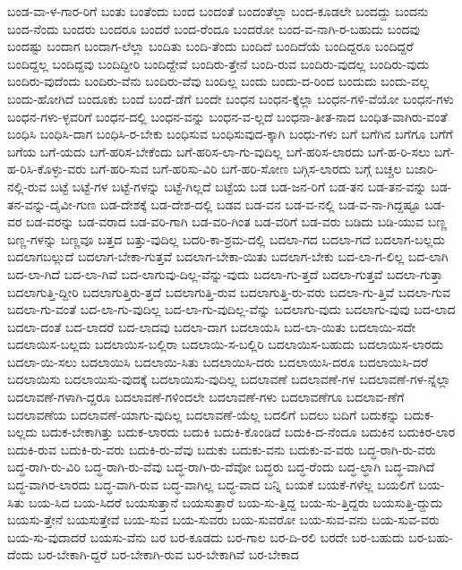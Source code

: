 {ಬಂಡ-ವಾ-ಳ-ಗಾರ-ರಿಗೆ
ಬಂತು
ಬಂತೆಂದು
ಬಂದ
ಬಂದಂತೆ
ಬಂದಂತೆಲ್ಲಾ
ಬಂದ-ಕೂಡಲೇ
ಬಂದದ್ದು
ಬಂದನು
ಬಂದ-ನೆಂದು
ಬಂದರು
ಬಂದರೂ
ಬಂದರೆ
ಬಂದ-ರೆಂದೂ
ಬಂದರೋ
ಬಂದ-ವ-ನಾಗಿ-ರ-ಬಹುದು
ಬಂದವು
ಬಂದಷ್ಟು
ಬಂದಾಗ
ಬಂದಾಗ-ಲೆಲ್ಲಾ
ಬಂದಿತು
ಬಂದಿ-ತೆಂದು
ಬಂದಿದೆ
ಬಂದಿದೆಯೆ
ಬಂದಿದ್ದರೂ
ಬಂದಿದ್ದರೆ
ಬಂದಿದ್ದಲ್ಲ
ಬಂದಿದ್ದವು
ಬಂದಿದ್ದೀರಿ
ಬಂದಿದ್ದೇವೆ
ಬಂದಿರು-ತ್ತೇನೆ
ಬಂದಿ-ರುವ
ಬಂದಿರು-ವುದಲ್ಲ
ಬಂದಿರು-ವುದು
ಬಂದಿರು-ವುದೆಂದು
ಬಂದಿರು-ವೆನು
ಬಂದಿರು-ವೆವು
ಬಂದಿಲ್ಲ
ಬಂದು
ಬಂದು-ದ-ರಿಂದ
ಬಂದುದು
ಬಂದು-ವಲ್ಲ
ಬಂದು-ಹೋಗಿದೆ
ಬಂದೂಕು
ಬಂದೆ
ಬಂದೆ-ಡೆಗೆ
ಬಂದೇ
ಬಂಧನ
ಬಂಧನ-ಕ್ಕೆಲ್ಲಾ
ಬಂಧನ-ಗಳಿ-ವೆಯೋ
ಬಂಧನ-ಗಳು
ಬಂಧನ-ಗಳು-ಳ್ಳವರಿಗೆ
ಬಂಧನ-ದಲ್ಲಿ
ಬಂಧನ-ವನ್ನು
ಬಂಧನ-ವ-ಲ್ಲದೆ
ಬಂಧನಾ-ತೀತ-ನಾದ
ಬಂಧಿತ-ವಾಗಿರು-ವಂತೆ
ಬಂಧಿಸಿ
ಬಂಧಿಸಿ-ದಾಗ
ಬಂಧಿಸಿ-ರ-ಬೇಕು
ಬಂಧಿಸುವ
ಬಂಧಿಸುವುದ-ಕ್ಕಾಗಿ
ಬಂಧು-ಗಳು
ಬಗೆ
ಬಗೆಗಿನ
ಬಗೆಗೂ
ಬಗೆಗೆ
ಬಗೆಯ
ಬಗೆ-ಯದು
ಬಗೆ-ಹರಿಸ-ಬೇಕೆಂದು
ಬಗೆ-ಹರಿಸ-ಲಾ-ಗು-ವುದಿಲ್ಲ
ಬಗೆ-ಹರಿಸ-ಲಾರದು
ಬಗೆ-ಹ-ರಿ-ಸಲು
ಬಗೆ-ಹ-ರಿಸಿ-ಕೊಳ್ಳು-ವರು
ಬಗೆ-ಹರಿ-ಸುವ
ಬಗೆ-ಹರಿಸು-ವಿರಿ
ಬಗೆ-ಹರಿ-ಸೋಣ
ಬಗ್ಗಿಸ-ಲಾರದು
ಬಗ್ಗೆ
ಬಚ್ಚಲ
ಬಜಾರಿ-ನಲ್ಲಿ-ರುವ
ಬಟ್ಟೆ
ಬಟ್ಟೆ-ಗಳ
ಬಟ್ಟೆ-ಗಳನ್ನು
ಬಟ್ಟೆ-ಗಿಲ್ಲದೆ
ಬಟ್ಟೆಯ
ಬಡ
ಬಡ-ಜನ-ರಿಗೆ
ಬಡ-ತನ
ಬಡ-ತನ-ವನ್ನು
ಬಡ-ತನ-ವನ್ನು-ದೈವೀ-ಗುಣ
ಬಡ-ದೇಶಕ್ಕೆ
ಬಡ-ದೇಶ-ದಲ್ಲಿ
ಬಡವ
ಬಡ-ವನ
ಬಡ-ವ-ನಲ್ಲಿ
ಬಡ-ವ-ನಾ-ಗಿದ್ದಷ್ಟೂ
ಬಡ-ವರ
ಬಡ-ವರನ್ನು
ಬಡ-ವರಾದ
ಬಡ-ವರಿ-ಗಾಗಿ
ಬಡ-ವರಿ-ಗಿಂತ
ಬಡ-ವರಿಗೆ
ಬಡ-ವರು
ಬಡಿದು
ಬಡಿ-ಯುವ
ಬಣ್ಣ
ಬಣ್ಣ-ಗಳನ್ನು
ಬಣ್ಣವೂ
ಬತ್ತದ
ಬತ್ತು-ವುದಿಲ್ಲ
ಬದರಿ-ಕಾ-ಶ್ರಮ-ದಲ್ಲಿ
ಬದಲಾ-ಗದ
ಬದಲಾ-ಗದೆ
ಬದಲಾಗ-ಬಲ್ಲದು
ಬದಲಾಗಬಲ್ಲುದೆ
ಬದಲಾಗ-ಬೇಕಾ-ಗುತ್ತವೆ
ಬದಲಾಗ-ಬೇಕಾ-ಯಿತು
ಬದಲಾಗ-ಬೇಕು
ಬದ-ಲಾ-ಗ-ಲಿಲ್ಲ
ಬದ-ಲಾಗಿ
ಬದ-ಲಾ-ಗಿದೆ
ಬದ-ಲಾ-ಗಿವೆ
ಬದ-ಲಾಗುವು-ದಿಲ್ಲ-ವೆನ್ನು-ವುದು
ಬದಲಾ-ಗು-ತ್ತದೆ
ಬದಲಾ-ಗುತ್ತವೆ
ಬದಲಾ-ಗುತ್ತಾ
ಬದಲಾಗುತ್ತಿ-ದ್ದೀರಿ
ಬದಲಾಗುತ್ತಿರು-ತ್ತದೆ
ಬದಲಾಗುತ್ತಿ-ರುವ
ಬದಲಾಗುತ್ತಿ-ರು-ವರು
ಬದಲಾ-ಗು-ತ್ತಿವೆ
ಬದಲಾ-ಗುವ
ಬದಲಾ-ಗು-ವಂತೆ
ಬದ-ಲಾ-ಗು-ವುದಿಲ್ಲ
ಬದ-ಲಾ-ಗು-ವುದಿಲ್ಲ-ವೆನ್ನು
ಬದಲಾಗು-ವುದು
ಬದಲಾಗು-ವುವು
ಬದ-ಲಾದ
ಬದಲಾ-ದಂತೆ
ಬದ-ಲಾದರೆ
ಬದ-ಲಾದವು
ಬದಲಾ-ದಾಗ
ಬದಲಾಯಸಿ
ಬದ-ಲಾ-ಯಿತು
ಬದಲಾಯಿ-ಸದೇ
ಬದಲಾಯಿಸ-ಬಲ್ಲದು
ಬದಲಾಯಿಸ-ಬಲ್ಲಿರಾ
ಬದಲಾಯಿ-ಸ-ಬಲ್ಲಿರಿ
ಬದಲಾಯಿಸ-ಬಹುದು
ಬದಲಾಯಿಸ-ಲಾರದು
ಬದಲಾ-ಯಿ-ಸಲು
ಬದಲಾಯಿಸಿ
ಬದಲಾಯಿ-ಸಿತು
ಬದಲಾಯಿಸಿ-ದರು
ಬದಲಾಯಿಸಿ-ದರೂ
ಬದಲಾಯಿಸಿ-ದರೆ
ಬದಲಾಯಿಸು
ಬದಲಾಯಿಸು-ವುದಕ್ಕೆ
ಬದಲಾಯಿಸು-ವುದಿಲ್ಲ
ಬದಲಾವಣೆ
ಬದಲಾವಣೆ-ಗಳ
ಬದಲಾವಣೆ-ಗಳ-ನ್ನೆಲ್ಲಾ
ಬದಲಾವಣೆ-ಗಳಾಗಿ-ದ್ದರೂ
ಬದಲಾವಣೆ-ಗಳಿಂದಲೇ
ಬದಲಾವಣೆ-ಗಳು
ಬದಲಾವಣೆಗೂ
ಬದಲಾವ-ಣೆಗೆ
ಬದಲಾವಣೆಯ
ಬದಲಾವಣೆ-ಯಾಗು-ವುದಿಲ್ಲ
ಬದಲಾವಣೆ-ಯೆಲ್ಲ
ಬದಲಿಗೆ
ಬದಲು
ಬದಿಗೆ
ಬದುಕನ್ನು
ಬದುಕ-ಬಲ್ಲದು
ಬದುಕ-ಬೇಕಾಗಿತ್ತು
ಬದುಕ-ಲಾರದು
ಬದುಕಿ
ಬದುಕಿ-ಕೊಂಡಿದೆ
ಬದುಕಿ-ದ-ನೆಂದೂ
ಬದುಕಿನ
ಬದುಕಿರ-ಲಾರ
ಬದುಕಿ-ರುವ
ಬದುಕಿ-ರು-ವರು
ಬದುಕಿ-ರು-ವೆವು
ಬದುಕು
ಬದುಕು-ವನು
ಬದುಕು-ವ-ವರು
ಬದ್ಧ-ರಾಗಿ-ರು-ವರು
ಬದ್ಧ-ರಾಗಿ-ರು-ವಿರಿ
ಬದ್ಧ-ರಾಗಿ-ರು-ವೆವು
ಬದ್ಧ-ರಾಗಿ-ರು-ವೆವೋ
ಬದ್ಧರು
ಬದ್ಧ-ರೆಂದು
ಬದ್ಧ-ಲ್ಧಾಗಿ
ಬದ್ಧ-ವಾಗಿದೆ
ಬದ್ಧ-ವಾಗಿರ-ಲಾರದು
ಬದ್ಧ-ವಾಗಿ-ರುವ
ಬದ್ಧ-ವಾಗಿಲ್ಲ
ಬದ್ಧ-ವಾದ
ಬನ್ನಿ
ಬಯಕೆ
ಬಯಕೆ-ಗಳೆಲ್ಲ
ಬಯಲಿಗೆ
ಬಯ-ಸಿತು
ಬಯ-ಸಿದ
ಬಯ-ಸಿದರೆ
ಬಯಸುತ್ತಾನೆ
ಬಯಸುತ್ತಾರೆ
ಬಯ-ಸು-ತ್ತಿದ್ದ
ಬಯ-ಸು-ತ್ತಿದ್ದರು
ಬಯಸುತ್ತಿ-ದ್ದುದು
ಬಯಸು-ತ್ತೇನೆ
ಬಯಸುತ್ತೇವೆ
ಬಯ-ಸುವ
ಬಯ-ಸುವರು
ಬಯ-ಸುವರೋ
ಬಯ-ಸುವ-ವನು
ಬಯ-ಸುವ-ವರು
ಬಯ-ಸು-ವುದಾದರೆ
ಬಯಸು-ವೆನು
ಬರ
ಬರ-ಕೂಡದು
ಬರ-ಗಾಲ
ಬರ-ದಿ-ರಲಿ
ಬರದೇ
ಬರ-ಬಹುದು
ಬರ-ಬಹು-ದೆಂದು
ಬರ-ಬೇಕಾಗಿ-ದ್ದರೆ
ಬರ-ಬೇಕಾಗಿ-ರುವ
ಬರ-ಬೇಕಾಗಿವೆ
ಬರ-ಬೇಕಾದ
}
